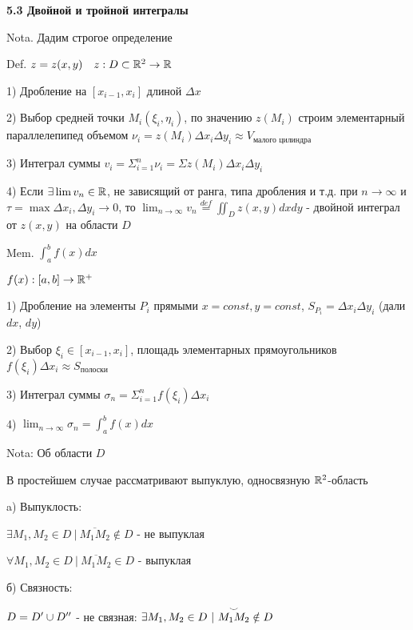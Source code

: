 \documentclass[12pt]{article}
\begin{document}
    \textbf{5.3 Двойной и тройной интегралы}

    Nota. Дадим строгое определение

    \begin{multicols}{2}
        Def. $z = z(x, y) \quad z : D \subset \mathbb{R}^2 \rightarrow \mathbb{R}$

        1) Дробление на $[x_{i-1}, x_i]$ длиной $\Delta x$

        2) Выбор средней точки $M_i(\xi_i, \eta_i)$, по значению $z(M_i)$ строим элементарный параллелепипед объемом
        $\nu_i = z(M_i) \Delta x_i \Delta y_i \approx V_{\text{малого цилиндра}}$

        3) Интеграл суммы $v_i = \Sigma_{i=1}^n \nu_i = \Sigma z(M_i) \Delta x_i \Delta y_i$

        4) Если $\exists \lim v_n \in \mathbb{R}$, не зависящий от ранга, типа дробления и т.д. при $n \rightarrow \infty$ и
        $\tau = \max \Delta x_i, \Delta y_i \to 0$, то $\lim_{n\to\infty} v_n \stackrel{def}{=} \iint_D z(x, y) dx dy$ - двойной интеграл от $z(x, y)$ на области $D$

        Mem. $\int_a^b f(x) dx$

        $f(x) : [a, b] \rightarrow \mathbb{R}^+$

        1) Дробление на элементы $P_i$ прямыми $x = const, y = const$, $S_{P_i} = \Delta x_i \Delta y_i$ (дали $dx$, $dy$)

        2) Выбор $\xi_i \in [x_{i-1}, x_i]$, площадь элементарных прямоугольников $f(\xi_i)\Delta x_i \approx S_{\text{полоски}}$

        3) Интеграл суммы $\sigma_n = \Sigma_{i=1}^n f(\xi_i) \Delta x_i$

        4) $\lim_{n\to\infty} \sigma_n = \int^b_a f(x) dx$
    \end{multicols}

    Nota: Об области $D$

    В простейшем случае рассматривают выпуклую, односвязную $\mathbb{R}^2$-область

    a) Выпуклость:

    $\exists M_1, M_2 \in D \ | \ \overline{M_1 M_2} \notin D$ - не выпуклая

    $\forall M_1, M_2 \in D \ | \ \overline{M_1 M_2} \in D$ - выпуклая

    б) Связность:

    $D = D^\prime \cup D^{\prime\prime}$ - не связная: $\exists M_1, M_2 \in D \ | \ \overset{\LARGE\smile}{M_1 M_2} \notin D$
\end{document}
